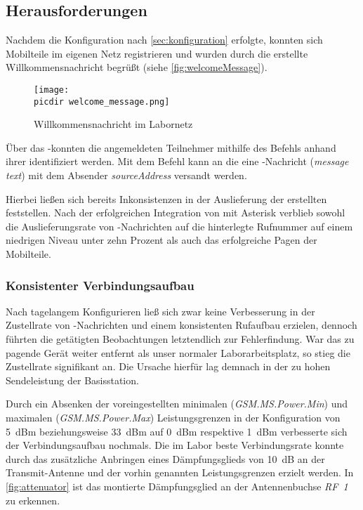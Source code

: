 \subsection{Herausforderungen}
\label{sec:herausforderung}
Nachdem die Konfiguration nach \autoref{sec:konfiguration} erfolgte, konnten sich Mobilteile im eigenen Netz registrieren und wurden durch die erstellte Willkommensnachricht begrüßt (siehe \autoref{fig:welcomeMessage}).

\begin{figure}[h!]
	\centering
	\texttt{[image: \\picdir welcome\_message.png]}
	\caption{Willkommensnachricht im Labornetz}
	\label{fig:welcomeMessage}
	
\end{figure}
Über das \OpenBTS-\CLI konnten die angemeldeten Teilnehmer mithilfe des Befehls  anhand ihrer \IMSI identifiziert werden. Mit dem Befehl  kann an die \emph{\IMSI} eine \SMS-Nachricht (\emph{message text}) mit dem Absender \emph{sourceAddress} versandt werden.

Hierbei ließen sich bereits Inkonsistenzen in der Auslieferung der erstellten \SMS feststellen. Nach der erfolgreichen Integration von \OpenBTS mit Asterisk verblieb sowohl die Auslieferungsrate von \SMS-Nachrichten auf die hinterlegte Rufnummer auf einem niedrigen Niveau unter zehn Prozent als auch das erfolgreiche Pagen der Mobilteile.
\subsubsection{Konsistenter Verbindungsaufbau}
Nach tagelangem Konfigurieren ließ sich zwar keine Verbesserung in der Zustellrate von \SMS-Nachrichten und einem konsistenten Rufaufbau erzielen, dennoch führten die getätigten Beobachtungen letztendlich zur Fehlerfindung. War das zu pagende Gerät weiter entfernt als unser normaler Laborarbeitsplatz, so stieg die Zustellrate signifikant an.
Die Ursache hierfür lag demnach in der zu hohen Sendeleistung der Basisstation.

Durch ein Absenken der voreingestellten minimalen (\emph{GSM.MS.Power.Min}) und maximalen (\emph{GSM.MS.Power.Max}) Leistungsgrenzen in der Konfiguration von \SI{5}{dBm} beziehungsweise \SI{33}{dBm} auf \SI{0}{dBm} respektive \SI{1}{dBm} verbesserte sich der Verbindungsaufbau nochmals. 
Die im Labor beste Verbindungsrate konnte durch das zusätzliche Anbringen eines Dämpfungsglieds von \SI{10}{dB} an der Transmit-Antenne und der vorhin genannten Leistungsgrenzen erzielt werden. 
In \autoref{fig:attenuator} ist das montierte Dämpfungsglied an der Antennenbuchse \emph{RF~1} zu erkennen.

